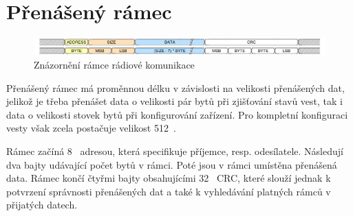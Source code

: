 \section{Přenášený rámec}
\begin{figure}[H]
    \begin{center}
        \includegraphics[width=\textwidth]{img/lgrf_packet}
    \end{center}
    \caption{Znázornění rámce rádiové komunikace}
\end{figure}

Přenášený rámec má proměnnou délku v závislosti na velikosti přenášených dat, jelikož je třeba přenášet data o velikosti pár bytů při zjišťování stavů vest, tak i data o velikosti stovek bytů při konfigurování zařízení. Pro kompletní konfiguraci vesty však zcela postačuje velikost 512~.

Rámec začíná 8~ adresou, která specifikuje příjemce, resp. odesílatele. Následují dva bajty udávající počet bytů v rámci. Poté jsou v rámci umístěna přenášená data. Rámec končí čtyřmi bajty obsahujícími 32~ CRC, které slouží jednak k potvrzení správnosti přenášených dat a také k vyhledávání platných rámců v přijatých datech.

